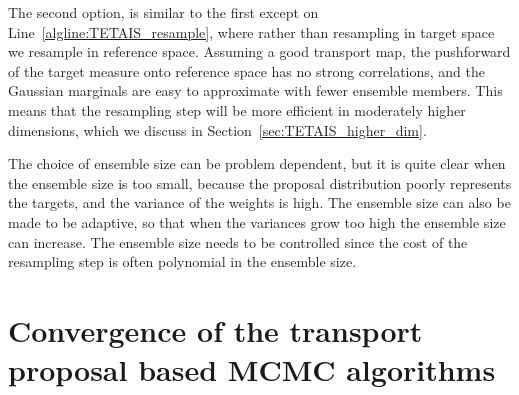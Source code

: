 \documentclass[final]{siamltex}
\newcommand{\edit}[1]{{\color{red} #1}}
\begin{document}
The second option, is similar to
the first except on Line~\ref{algline:TETAIS_resample}, where rather
than resampling in target space we resample in reference
space. Assuming a good transport map, the pushforward of the target
measure onto 
reference space has no strong correlations, and the
Gaussian marginals are easy to approximate with fewer ensemble
members. This means that the resampling step will be more efficient in
moderately higher dimensions, which we discuss in
Section~\ref{sec:TETAIS_higher_dim}.

\edit{The choice of ensemble size can be problem dependent, but it is quite clear when the ensemble size is
  too small, because the proposal distribution poorly represents the
  targets, and the variance of the weights is high. The ensemble size
  can also be made to be adaptive, so that when the variances grow too
high the ensemble size can increase. The ensemble size needs to be
controlled since the cost of the resampling step is often polynomial
in the ensemble size.}

\section[Convergence of transport MCMC]{Convergence of the transport proposal based MCMC algorithms}\label{sec:conv}
\end{document}
